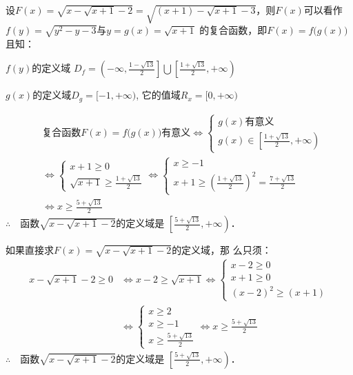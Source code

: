 \begin{solution}
设$F(x)=\sqrt{x-\sqrt{x+1}-2}=\sqrt{(x+1)-\sqrt{x+1}-3}$，则$F(x)$可以看作$f(y)=\sqrt{y^2-y-3}$与$y=g(x)=\sqrt{x+1}$
的复合函数，即$F(x)=f\big(g(x)\big)$且知：

$f(y)$的定义域
$D_f=\left(-\infty,\frac{1-\sqrt{13}}{2}\right]\bigcup\left[\frac{1+\sqrt{13}}{2},+\infty\right)$

$g(x)$的定义域$D_g=[-1,+\infty)$, 它的值域$R_x=[0,+\infty)$

\[\begin{split}
&\text{复合函数$F(x)=f\big(g(x)\big)$有意义}\Longleftrightarrow
\begin{cases}
    g(x)\text{有意义}\\
    g(x)\in\left[\frac{1+\sqrt{13}}{2},+\infty\right)
\end{cases}\\
&\Longleftrightarrow
\begin{cases}
    x+1\ge 0\\
    \sqrt{x+1}\ge \frac{1+\sqrt{13}}{2}
\end{cases}\Longleftrightarrow
\begin{cases}
    x\ge -1\\
    x+1\ge \left(\frac{1+\sqrt{13}}{2}\right)^2=\frac{7+\sqrt{13}}{2}
\end{cases}\\
&\Longleftrightarrow x\ge \frac{5+\sqrt{13}}{2}
\end{split}\]
$\therefore\quad $函数$\sqrt{x-\sqrt{x+1}-2}$的定义域是
$\left[\frac{5+\sqrt{13}}{2},+\infty\right)$．

如果直接求$F(x)=\sqrt{x-\sqrt{x+1}-2}$的定义域，那
么只须：
\[\begin{split}
   x-\sqrt{x+1}-2\ge 0& \Longleftrightarrow x-2\ge \sqrt{x+1} \Longleftrightarrow \begin{cases}
    x-2\ge 0\\ x+1\ge 0\\ (x-2)^2\ge (x+1)
\end{cases}\\
& \Longleftrightarrow \begin{cases}
    x\ge 2\\x\ge -1\\ x\ge \frac{5+\sqrt{13}}{2}
\end{cases} \Longleftrightarrow x\ge \frac{5+\sqrt{13}}{2}
\end{split}\]
$\therefore\quad $函数$\sqrt{x-\sqrt{x+1}-2}$的定义域是
$\left[\frac{5+\sqrt{13}}{2},+\infty\right)$．
\end{solution}

